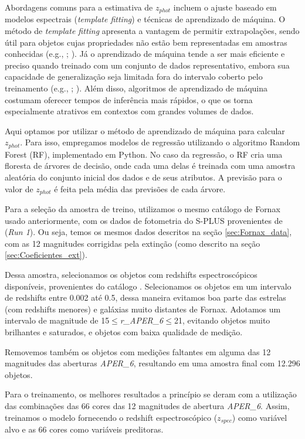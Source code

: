 Abordagens comuns para a estimativa de \textit{$z_{phot}$} incluem o ajuste baseado em modelos espectrais (\textit{template fitting}) e técnicas de aprendizado de máquina. O método de \textit{template fitting} apresenta a vantagem de permitir extrapolações, sendo útil para objetos cujas propriedades não estão bem representadas em amostras conhecidas (e.g., \citealt{Bolzonella_2000}; \citealt{Gorecki_2014}). Já o aprendizado de máquina tende a ser mais eficiente e preciso quando treinado com um conjunto de dados representativo, embora sua capacidade de generalização seja limitada fora do intervalo coberto pelo treinamento (e.g., \citealt{Carrasco_2013}; \citealt{Sadeh_2016}). Além disso, algoritmos de aprendizado de máquina costumam oferecer tempos de inferência mais rápidos, o que os torna especialmente atrativos em contextos com grandes volumes de dados.


Aqui optamos por utilizar o método de aprendizado de máquina para calcular \textit{$z_{phot}$}. Para isso, empregamos modelos de regressão utilizando o algoritmo Random Forest (RF), implementado em Python. No caso da regressão, o RF cria uma floresta de árvores de decisão, onde cada uma delas é treinada com uma amostra aleatória do conjunto inicial dos dados e de seus atributos. A previsão para o valor de \textit{$z_{phot}$} é feita pela média das previsões de cada árvore.

Para a seleção da amostra de treino, utilizamos o mesmo catálogo de Fornax usado anteriormente, com os dados de fotometria do S-PLUS provenientes de \cite{haack2024splusfornaxprojectsfp} (\textit{Run 1}). Ou seja, temos os mesmos dados descritos na seção \ref{sec:Fornax_data}, com as 12 magnitudes corrigidas pela extinção (como descrito na seção \ref{sec:Coeficientes_ext}).

Dessa amostra, selecionamos os objetos com redshifts espectroscópicos disponíveis, provenientes do catálogo \cite{Lima_2024}. Selecionamos os objetos em um intervalo de redshifts entre 0.002 até 0.5, dessa maneira evitamos boa parte das estrelas (com redshifts menores) e galáxias muito distantes de Fornax. Adotamos um intervalo de magnitude de 15$\leq$\textit{r\_APER\_6}$\leq$21, evitando objetos muito brilhantes e saturados, e objetos com baixa qualidade de medição.

Removemos também os objetos com medições faltantes em alguma das 12 magnitudes das aberturas \textit{APER\_6}, resultando em uma amostra final com 12.296 objetos.

Para o treinamento, os melhores resultados a princípio se deram com a utilização das combinações das 66 cores das 12 magnitudes de abertura \textit{APER\_6}. Assim, treinamos o modelo fornecendo o redshift espectroscópico (\textit{$z_{spec}$}) como variável alvo e as 66 cores como variáveis preditoras.

